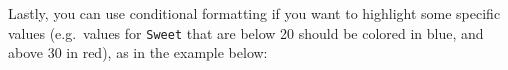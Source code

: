 \documentclass[
]{krantz}
\makeatletter
\newenvironment{Shaded}{\begin{snugshade}}{\end{snugshade}}
\newcommand{\AttributeTok}[1]{\textcolor[rgb]{0.61,0.61,0.61}{#1}}
\newcommand{\DecValTok}[1]{\textcolor[rgb]{0.06,0.06,0.06}{#1}}
\newcommand{\FunctionTok}[1]{\textcolor[rgb]{0,0,0}{#1}}
\newcommand{\NormalTok}[1]{#1}
\newcommand{\OtherTok}[1]{\textcolor[rgb]{0.37,0.37,0.37}{#1}}
\newcommand{\SpecialCharTok}[1]{\textcolor[rgb]{0,0,0}{#1}}
\newcommand{\StringTok}[1]{\textcolor[rgb]{0.5,0.5,0.5}{#1}}
\newenvironment{kframe}{%
\medskip{}
\setlength{\fboxsep}{.8em}
 \def\at@end@of@kframe{}%
 \ifinner\ifhmode%
  \def\at@end@of@kframe{\end{minipage}}%
  \begin{minipage}{\columnwidth}%
 \fi\fi%
 \def\FrameCommand##1{\hskip\@totalleftmargin \hskip-\fboxsep
 \colorbox{shadecolor}{##1}\hskip-\fboxsep
     \hskip-\linewidth \hskip-\@totalleftmargin \hskip\columnwidth}%
 \MakeFramed {\advance\hsize-\width
   \@totalleftmargin\z@ \linewidth\hsize
   \@setminipage}}%
 {\par\unskip\endMakeFramed%
 \at@end@of@kframe}
\renewenvironment{Shaded}{\begin{kframe}}{\end{kframe}}
\makeatother
\begin{document}
Lastly, you can use conditional formatting if you want to highlight some specific values (e.g.~values for \texttt{Sweet} that are below 20 should be colored in blue, and above 30 in red), as in the example below:

\begin{Shaded}
\end{Shaded}

\providecommand{\docline}[3]{\noalign{\global\setlength{\arrayrulewidth}{#1}}\arrayrulecolor[HTML]{#2}\cline{#3}}

\setlength{\tabcolsep}{0pt}

\renewcommand*{\arraystretch}{1.5}
\end{document}
